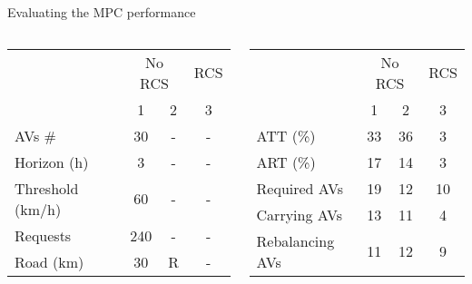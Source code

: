 \begin{frame}{Evaluating the MPC performance}
	\begin{columns}
		\begin{column}{0.4\textwidth}
			\begin{table}
			\begin{tabular}{ |l| c|c|c|}
				\cline{2-4}
				\multicolumn{1}{c|}{}&\multicolumn{2}{c|}{No RCS}& RCS\\
				\cline{2-4}
				\multicolumn{1}{c|}{}& 1 &  2&3\\
				\cline{1-4}
				AVs \#& 30&-&-\\
				Horizon (h) & 3 &-& -\\
				Threshold (km/h) & 60&-&-\\
				Requests & 240&-&-\\
				Road (km) & 30&R&-\\
			\end{tabular}
		\end{table}
		\end{column}
		\begin{column}{0.4\textwidth}
			\begin{table}
			\begin{tabular}{ |p{2.9cm}|c|c|c|}
				\cline{2-4}
				\multicolumn{1}{c|}{}&\multicolumn{2}{c|}{No RCS}& RCS\\
				\cline{2-4}
				\multicolumn{1}{c|}{}& 1 &  2&3\\
				\cline{1-4}
				ATT	(\%)		&33&36& 3\\
				ART	(\%)		&17&14 &3\\
				Required AVs			&19&12& 10\\
				Carrying AVs			&13&11&4\\
				Rebalancing AVs			&11&12 &9\\
			\end{tabular}
		\end{table}
		\end{column}
	\end{columns}
\end{frame}
